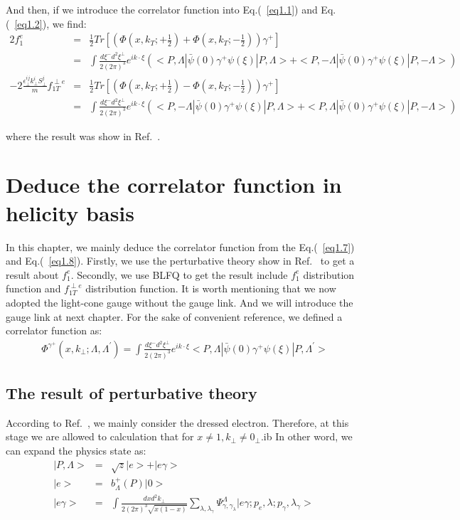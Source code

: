 \documentclass[a4paper,12pt]{article}
\begin{document}
And then, if we introduce the correlator function into Eq.(~\ref{eq1.1}) and Eq.(~\ref{eq1.2}), we find:
\begin{eqnarray}
2f_1^e &=& \frac{1}{2} Tr[(\Phi(x,k_T;+\frac{1}{2})+\Phi(x,k_T;-\frac{1}{2}))\gamma^+]\nonumber\\
&=&\int \frac{d \xi^- d^2 \xi^{\perp}}{2(2\pi)^3} e^{ik \cdot \xi} (<P,\Lambda|\bar{\psi}(0)\gamma^+\psi(\xi)|P,\Lambda>+<P,-\Lambda|\bar{\psi}(0)\gamma^+\psi(\xi)|P,-\Lambda>)\label{eq1.7}\\
-2\frac{\epsilon^{ij}_{\perp}k_{\perp}^i S^j_{\perp}}{m}f^{\perp e}_{1T}&=& \frac{1}{2}Tr[(\Phi(x,k_{T};+\frac{1}{2})-\Phi(x,k_{T};-\frac{1}{2}))\gamma^+]\nonumber\\
&=& \int \frac{d \xi^- d^2 \xi^{\perp}}{2(2\pi)^3} e^{ik \cdot \xi}(<P,-\Lambda|\bar{\psi}(0)\gamma^+\psi(\xi)|P,\Lambda>+<P,\Lambda|\bar{\psi}(0)\gamma^+\psi(\xi)|P,-\Lambda>)\label{eq1.8}\
\end{eqnarray}

where the result was show in Ref.~\cite{prd2}.

\section{Deduce the correlator function in helicity basis}

In this chapter, we mainly deduce the correlator function from the Eq.(~\ref{eq1.7}) and Eq.(~\ref{eq1.8}).
Firstly, we use the perturbative theory show in Ref.~\cite{prd1} to get a result about $f_1^e$.
Secondly, we use BLFQ to get the result include $f_1^e$ distribution function and $f_{1T}^{\perp e}$ distribution function.
It is worth mentioning that we now adopted the light-cone gauge without the gauge link. And we will introduce the gauge link at next chapter.
For the sake of convenient reference, we defined a correlator function as:
\begin{eqnarray}
\Phi^{\gamma^+}(x,k_{\perp};\Lambda,\Lambda^{\prime}) = \int \frac{d \xi^- d^2 \xi^{\perp}}{2(2\pi)^3} e^{ik \cdot \xi}<P,\Lambda|\bar{\psi}(0)\gamma^+\psi(\xi)|P,\Lambda^{\prime}>\label{eq1.9}
\end{eqnarray}

\subsection{The result of perturbative theory}

According to Ref.~\cite{prd1}, we mainly consider the dressed electron.
Therefore, at this stage we are allowed to calculation that for $x\neq1, k_{\perp}\neq 0_{\perp}$.ib
In other word, we can expand the physics state as:
\begin{eqnarray}
|P,\Lambda> &=&\sqrt{z} |e> + |e\gamma>\nonumber\\
|e> &=& b^+_{\Lambda}(P)|0>\nonumber\\
|e\gamma> &=& \int \frac{dxd^2k_{\perp}}{2(2\pi)^3\sqrt{x(1-x)}} \sum_{\lambda,\lambda_{\gamma}} \Psi^{\Lambda}_{\gamma,\gamma_{\lambda}} |e\gamma;p_e,\lambda;p_{\gamma},\lambda_{\gamma}>\
\end{eqnarray}
\end{document}
